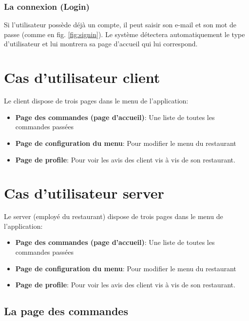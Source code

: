 \documentclass[french, a4paper, 12pt]{report}
\begin{document}
		\subsubsection{La connexion (Login)} Si l'utilisateur possède déjà un compte, il peut saisir son e-mail et son mot de passe (comme en fig. \ref{fig:signin}). Le système détectera automatiquement le type d'utilisateur et lui montrera sa page d'accueil qui lui correspond.
		 
	\newpage
	\section{Cas d'utilisateur client} Le client dispose de trois pages dans le menu de l'application:
		\begin{itemize}
			\item \textbf{Page des commandes (page d'accueil)}: Une liste de toutes les commandes passées
			\item \textbf{Page de configuration du menu}: Pour modifier le menu du restaurant
			\item \textbf{Page de profile}: Pour voir les avis des client vis à vis de son restaurant.
		\end{itemize}
	\newpage
	\section{Cas d'utilisateur server} Le server (employé du restaurant) dispose de trois pages dans le menu de l'application:
		\begin{itemize}
			\item \textbf{Page des commandes (page d'accueil)}: Une liste de toutes les commandes passées
			\item \textbf{Page de configuration du menu}: Pour modifier le menu du restaurant
			\item \textbf{Page de profile}: Pour voir les avis des client vis à vis de son restaurant.
		\end{itemize}
		
		\subsection{La page des commandes}
		
\end{document}
